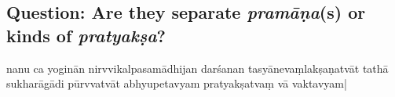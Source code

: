 \subsection{Question: Are they separate \emph{pramāṇa}(s) or kinds of \emph{pratyakṣa}?}
nanu ca yoginān ni\mde rvvikalpasamādhijan 
darśanan tasyānevaṃlakṣaṇatvāt tathā sukharāgādi%
%
%
\mde pūrvvatvāt  a\-bhy\-upetavyam pratyakṣatvaṃ vā vaktavyam| 

